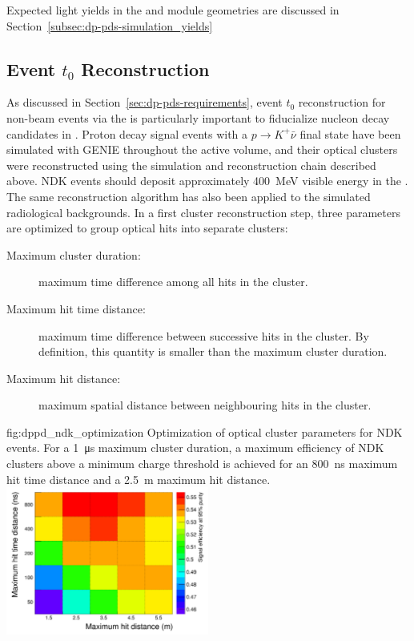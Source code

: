 
Expected  light yields in the  and   module geometries are discussed in Section~\ref{subsec:dp-pds-simulation_yields}


\subsection{Event $t_{0}$ Reconstruction}
\label{subsec:dp-pds-performance_t0}

As discussed in Section~\ref{sec:dp-pds-requirements}, event $t_0$ reconstruction for non-beam events via the  is particularly important to fiducialize nucleon decay candidates in . Proton decay signal events with a %
$p\rightarrow K^{+} \bar\nu$ final state have been simulated with GENIE \cite{Andreopoulos:2009rq} throughout the   active volume, and their optical clusters were reconstructed using the simulation and reconstruction chain described above. NDK events should deposit approximately \SI{400}{\MeV} visible energy in the \lar. The same reconstruction algorithm has also been applied to the simulated radiological backgrounds. In a first cluster reconstruction step, three parameters are optimized to group optical hits into separate clusters:
%
\begin{description}
\item[Maximum cluster duration:] maximum time difference among all  hits in the cluster.
\item[Maximum hit time distance:] maximum time difference between successive  hits in the cluster. By definition, this quantity is smaller than the maximum cluster duration.
\item[Maximum hit distance:] maximum spatial distance between neighbouring  hits in the cluster. 
\end{description}
%
\begin{dunefigure}{fig:dppd_ndk_optimization}
     {Optimization of optical cluster parameters for NDK events. For a \SI{1}{\us} maximum cluster duration, a maximum efficiency of NDK clusters above a minimum charge threshold is achieved for an \SI{800}{\ns} maximum hit time distance and a \SI{2.5}{\m} maximum hit distance.}
    \includegraphics[width=0.5\textwidth]{graphics/dppd_ndk_optimization.pdf}
    \end{dunefigure}

